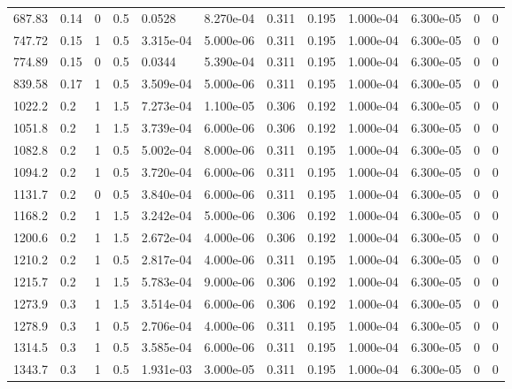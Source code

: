 \documentclass[preview]{standalone}
\begin{document}
{{\begin{tabular}{L{1.2cm}C{1.2cm} C{0.3cm}C{0.5cm} C{1.4cm}C{1.4cm} C{1.4cm}C{1.4cm} C{1.6cm}C{1.6cm} C{1.6cm}C{1.6cm}}
  687.83  &  0.14  & 0     & 0.5 &  0.0528  & 8.270e-04  &  0.311&   0.195& 1.000e-04 & 6.300e-05   &  0 & 0  \\ 
  747.72  &  0.15  & 1     & 0.5 &  3.315e-04  & 5.000e-06  &  0.311&   0.195& 1.000e-04 & 6.300e-05   &  0 & 0  \\ 
  774.89  &  0.15  & 0     & 0.5 &  0.0344  & 5.390e-04  &  0.311&   0.195& 1.000e-04 & 6.300e-05   &  0 & 0  \\ 
  839.58  &  0.17  & 1     & 0.5 &  3.509e-04  & 5.000e-06  &  0.311&   0.195& 1.000e-04 & 6.300e-05   &  0 & 0  \\ 
  1022.2  &   0.2  & 1     & 1.5 &  7.273e-04  & 1.100e-05  &  0.306&   0.192& 1.000e-04 & 6.300e-05   &  0 & 0  \\ 
  1051.8  &   0.2  & 1     & 1.5 &  3.739e-04  & 6.000e-06  &  0.306&   0.192& 1.000e-04 & 6.300e-05   &  0 & 0  \\ 
  1082.8  &   0.2  & 1     & 0.5 &  5.002e-04  & 8.000e-06  &  0.311&   0.195& 1.000e-04 & 6.300e-05   &  0 & 0  \\ 
  1094.2  &   0.2  & 1     & 0.5 &  3.720e-04  & 6.000e-06  &  0.311&   0.195& 1.000e-04 & 6.300e-05   &  0 & 0  \\ 
  1131.7  &   0.2  & 0     & 0.5 &  3.840e-04  & 6.000e-06  &  0.311&   0.195& 1.000e-04 & 6.300e-05   &  0 & 0  \\ 
  1168.2  &   0.2  & 1     & 1.5 &  3.242e-04  & 5.000e-06  &  0.306&   0.192& 1.000e-04 & 6.300e-05   &  0 & 0  \\ 
  1200.6  &   0.2  & 1     & 1.5 &  2.672e-04  & 4.000e-06  &  0.306&   0.192& 1.000e-04 & 6.300e-05   &  0 & 0  \\ 
  1210.2  &   0.2  & 1     & 0.5 &  2.817e-04  & 4.000e-06  &  0.311&   0.195& 1.000e-04 & 6.300e-05   &  0 & 0  \\ 
  1215.7  &   0.2  & 1     & 1.5 &  5.783e-04  & 9.000e-06  &  0.306&   0.192& 1.000e-04 & 6.300e-05   &  0 & 0  \\ 
  1273.9  &   0.3  & 1     & 1.5 &  3.514e-04  & 6.000e-06  &  0.306&   0.192& 1.000e-04 & 6.300e-05   &  0 & 0  \\ 
  1278.9  &   0.3  & 1     & 0.5 &  2.706e-04  & 4.000e-06  &  0.311&   0.195& 1.000e-04 & 6.300e-05   &  0 & 0  \\ 
  1314.5  &   0.3  & 1     & 0.5 &  3.585e-04  & 6.000e-06  &  0.311&   0.195& 1.000e-04 & 6.300e-05   &  0 & 0  \\ 
  1343.7  &   0.3  & 1     & 0.5 &  1.931e-03  & 3.000e-05  &  0.311&   0.195& 1.000e-04 & 6.300e-05   &  0 & 0  \\ 

\end{tabular}}}
\end{document}

